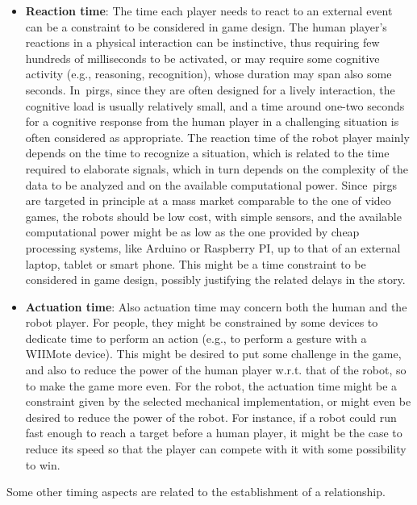 \begin{itemize}
\item \textbf{Reaction time}: The time each player needs to react to an external event can be a constraint to be considered in game design. The human player's reactions in a physical interaction can be instinctive, thus requiring few hundreds of milliseconds to be activated, or may require some cognitive activity (e.g., reasoning, recognition), whose duration may span also some seconds. In~\gls{pirg}s, since they are often designed for a lively interaction, the cognitive load is usually relatively small, and a time around one-two seconds for a cognitive response from the human player in a challenging situation is often considered as appropriate. The reaction time of the robot player mainly depends on the time to recognize a situation, which is related to the time required to elaborate signals, which in turn depends on the complexity of the data to be analyzed and on the available computational power. Since~\gls{pirg}s are targeted in principle at a mass market comparable to the one of video games, the robots should be low cost, with simple sensors, and the available computational power might be as low as the one provided by cheap processing systems, like Arduino or Raspberry PI, up to that of an external laptop, tablet or smart phone. This might be a time constraint to be considered in game design, possibly justifying the related delays in the story.

\item \textbf{Actuation time}: Also actuation time may concern both the human and the robot player. For people, they might be constrained by some devices to dedicate time to perform an action (e.g., to perform a gesture with a WIIMote device). This might be desired to put some challenge in the game, and also to reduce the power of the human player w.r.t. that of the robot, so to make the game more even. For the robot, the actuation time might be a constraint given by the selected mechanical implementation, or might even be desired to reduce the power of the robot. For instance, if a robot could run fast enough to reach a target before a human player, it might be the case to reduce its speed so that the player can compete with it with some possibility to win.
\end{itemize}

Some other timing aspects are related to the establishment of a relationship.


